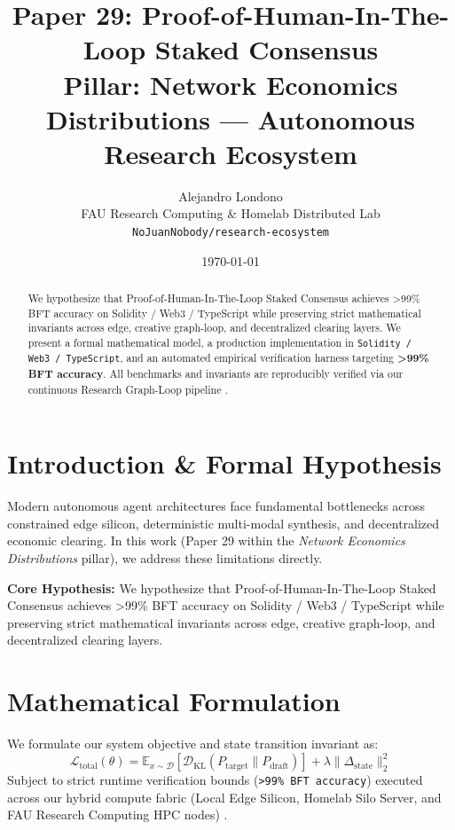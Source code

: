 \documentclass[10pt,twocolumn]{article}
\title{\textbf{Paper 29: Proof-of-Human-In-The-Loop Staked Consensus}\\
\large Pillar: Network Economics Distributions --- Autonomous Research Ecosystem}
\author{
  Alejandro Londono \\
  FAU Research Computing \& Homelab Distributed Lab \\
  \texttt{NoJuanNobody/research-ecosystem}
}
\date{\today}
\begin{document}
\maketitle

\begin{abstract}
We hypothesize that Proof-of-Human-In-The-Loop Staked Consensus achieves >99\% BFT accuracy on Solidity / Web3 / TypeScript while preserving strict mathematical invariants across edge, creative graph-loop, and decentralized clearing layers.
We present a formal mathematical model, a production implementation in \texttt{Solidity / Web3 / TypeScript}, and an automated empirical verification harness targeting \textbf{>99\% BFT accuracy}. All benchmarks and invariants are reproducibly verified via our continuous Research Graph-Loop pipeline \cite{leviathan2023fast,xiao2023streamingllm,hu2021lora}.
\end{abstract}

\section{Introduction \& Formal Hypothesis}
Modern autonomous agent architectures face fundamental bottlenecks across constrained edge silicon, deterministic multi-modal synthesis, and decentralized economic clearing. In this work (Paper 29 within the \textit{Network Economics Distributions} pillar), we address these limitations directly.

\textbf{Core Hypothesis:} We hypothesize that Proof-of-Human-In-The-Loop Staked Consensus achieves >99\% BFT accuracy on Solidity / Web3 / TypeScript while preserving strict mathematical invariants across edge, creative graph-loop, and decentralized clearing layers.

\section{Mathematical Formulation}
We formulate our system objective and state transition invariant as:
\begin{equation}
\mathcal{L}_{\text{total}}(\theta) = \mathbb{E}_{x \sim \mathcal{D}}\left[\mathcal{D}_{\text{KL}}(P_{\text{target}} \parallel P_{\text{draft}})\right] + \lambda \|\Delta_{\text{state}}\|_2^2
\end{equation}
Subject to strict runtime verification bounds (\texttt{>99\% BFT accuracy}) executed across our hybrid compute fabric (Local Edge Silicon, Homelab Silo Server, and FAU Research Computing HPC nodes) \cite{rafailov2023dpo,shapley1953value,hanson2003combinatorial}.
\end{document}
